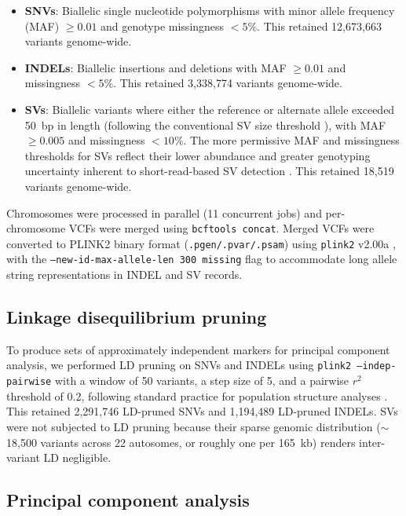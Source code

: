 \begin{itemize}
    \item \textbf{SNVs}: Biallelic single nucleotide polymorphisms with minor allele frequency (MAF) $\geq 0.01$ and genotype missingness $< 5\%$. This retained 12,673,663 variants genome-wide.
    \item \textbf{INDELs}: Biallelic insertions and deletions with MAF $\geq 0.01$ and missingness $< 5\%$. This retained 3,338,774 variants genome-wide.
    \item \textbf{SVs}: Biallelic variants where either the reference or alternate allele exceeded 50~bp in length (following the conventional SV size threshold \citep{alkan2011}), with MAF $\geq 0.005$ and missingness $< 10\%$. The more permissive MAF and missingness thresholds for SVs reflect their lower abundance and greater genotyping uncertainty inherent to short-read-based SV detection \citep{ho2020}. This retained 18,519 variants genome-wide.
\end{itemize}

Chromosomes were processed in parallel (11 concurrent jobs) and per-chromosome VCFs were merged using \texttt{bcftools concat}. Merged VCFs were converted to PLINK2 binary format (\texttt{.pgen/.pvar/.psam}) using \texttt{plink2} v2.00a \citep{chang2015}, with the \texttt{--new-id-max-allele-len 300 missing} flag to accommodate long allele string representations in INDEL and SV records.

\subsection*{Linkage disequilibrium pruning}

To produce sets of approximately independent markers for principal component analysis, we performed LD pruning on SNVs and INDELs using \texttt{plink2 --indep-pairwise} with a window of 50 variants, a step size of 5, and a pairwise $r^2$ threshold of 0.2, following standard practice for population structure analyses \citep{abdellaoui2013, price2006}. This retained 2,291,746 LD-pruned SNVs and 1,194,489 LD-pruned INDELs. SVs were not subjected to LD pruning because their sparse genomic distribution ($\sim$18,500 variants across 22 autosomes, or roughly one per 165~kb) renders inter-variant LD negligible.

\subsection*{Principal component analysis}

